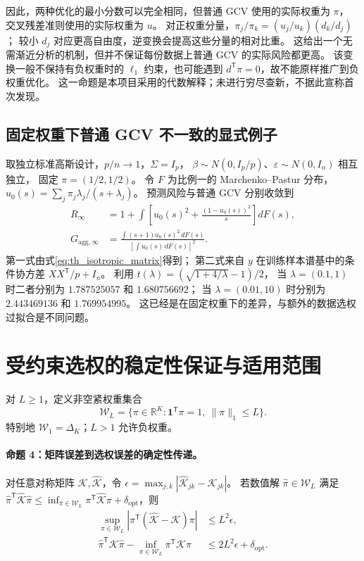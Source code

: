 因此，两种优化的最小分数可以完全相同，但普通 GCV 使用的实际权重为 $\pi$，
交叉残差准则使用的实际权重为 $u$。
对正权重分量，$\pi_j/\pi_k=(u_j/u_k)(d_k/d_j)$；
较小 $d_j$ 对应更高自由度，逆变换会提高这些分量的相对比重。
这给出一个无需渐近分析的机制，但并不保证每份数据上普通 GCV 的实际风险都更高。
该变换一般不保持有负权重时的 $\ell_1$ 约束，也可能遇到 $d^{\mathsf T}\pi=0$，故不能原样推广到负权重优化。
这一命题是本项目采用的代数解释；未进行穷尽查新，不据此宣称首次发现。

\subsection{固定权重下普通 GCV 不一致的显式例子}
取独立标准高斯设计，$p/n\to1$，$\Sigma=I_p$，
$\beta\sim N(0,I_p/p)$、$\varepsilon\sim N(0,I_n)$ 相互独立，
固定 $\pi=(1/2,1/2)$。
令 $F$ 为比例一的 Marchenko--Pastur 分布，
$u_0(s)=\sum_j\pi_j\lambda_j/(s+\lambda_j)$。
预测风险与普通 GCV 分别收敛到
\begin{align}
 R_\infty
 &=1+\int\left[u_0(s)^2+\frac{(1-u_0(s))^2}{s}\right]dF(s),\label{eq:th_mp_risk}\\
 G_{\mathrm{agg},\infty}
 &=\frac{\int(s+1)u_0(s)^2\,dF(s)}{\left[\int u_0(s)\,dF(s)\right]^2}.
 \label{eq:th_mp_gcv}
\end{align}
第一式由式\eqref{eq:th_isotropic_matrix}得到；
第二式来自 $y$ 在训练样本谱基中的条件协方差 $XX^{\mathsf T}/p+I_n$。
利用 $t(\lambda)=(\sqrt{1+4/\lambda}-1)/2$，
当 $\lambda=(0.1,1)$ 时二者分别为 $1.787525057$ 和 $1.680756692$；
当 $\lambda=(0.01,10)$ 时分别为 $2.443469136$ 和 $1.769954995$。
这已经是在固定权重下的差异，与额外的数据选权过拟合是不同问题。

\section{受约束选权的稳定性保证与适用范围}\label{sec:theory_stability}
对 $L\ge1$，定义非空紧权重集合
\begin{equation}\label{eq:th_weight_class}
 \mathcal W_L=\{\pi\in\mathbb R^K:\boldsymbol1^{\mathsf T}\pi=1,\ \lVert\pi\rVert_1\le L\}.
\end{equation}
特别地 $\mathcal W_1=\Delta_K$；$L>1$ 允许负权重。

\paragraph{命题 4：矩阵误差到选权误差的确定性传递。}
对任意对称矩阵 $\mathcal K,\widehat{\mathcal K}$，令
$\epsilon=\max_{j,k}|\widehat{\mathcal K}_{jk}-\mathcal K_{jk}|$。
若数值解 $\widehat\pi\in\mathcal W_L$ 满足
$\widehat\pi^{\mathsf T}\widehat{\mathcal K}\widehat\pi
\le\inf_{\pi\in\mathcal W_L}\pi^{\mathsf T}\widehat{\mathcal K}\pi+\delta_{\mathrm{opt}}$，则
\begin{align}
 \sup_{\pi\in\mathcal W_L}
 |\pi^{\mathsf T}(\widehat{\mathcal K}-\mathcal K)\pi|
 &\le L^2\epsilon,\label{eq:th_uniform_bound}\\
 \widehat\pi^{\mathsf T}\mathcal K\widehat\pi
 -\inf_{\pi\in\mathcal W_L}\pi^{\mathsf T}\mathcal K\pi
 &\le 2L^2\epsilon+\delta_{\mathrm{opt}}.
 \label{eq:th_oracle_bound}
\end{align}

